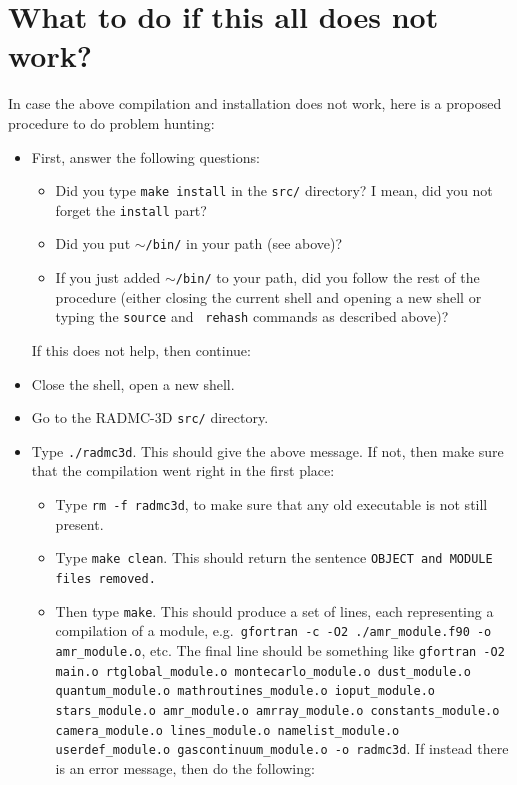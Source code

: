 \documentclass{report}
\begin{document}
\section{What to do if this all does not work?}
In case the above compilation and installation does not work, here is a 
proposed procedure to do problem hunting:
\begin{itemize}
\item First, answer the following questions:
  \begin{itemize}
    \item Did you type {\small\tt make install} in the {\small\tt src/}
      directory? I mean, did you not forget the {\small\tt install} part?
    \item Did you put $\sim${\small\tt /bin/} in your path (see above)?
    \item If you just added $\sim${\small\tt /bin/} to your path, did you
      follow the rest of the procedure (either closing the current shell and
      opening a new shell or typing the {\small\tt source} and {\small\tt
        rehash} commands as described above)?
  \end{itemize}
  If this does not help, then continue:
\item Close the shell, open a new shell.
\item Go to the RADMC-3D {\small\tt src/} directory.
\item Type {\small\tt ./radmc3d}. This should give the above message. If
  not, then make sure that the compilation went right in the first place:
  \begin{itemize}
  \item Type {\small\tt rm -f radmc3d}, to make sure that any old executable
    is not still present.
  \item Type {\small\tt make clean}. This should return the sentence
    {\small\tt OBJECT and MODULE files removed.}
  \item Then type {\small\tt make}. This should produce a set of lines, each
    representing a compilation of a module, e.g.\ {\small \tt gfortran -c -O2
      ./amr\_module.f90 -o amr\_module.o}, etc. The final line should be
    something like {\small\tt gfortran -O2 main.o rtglobal\_module.o
      montecarlo\_module.o dust\_module.o quantum\_module.o mathroutines\_module.o
      ioput\_module.o stars\_module.o amr\_module.o amrray\_module.o
      constants\_module.o camera\_module.o lines\_module.o namelist\_module.o
      userdef\_module.o gascontinuum\_module.o -o radmc3d}. If instead there
    is an error message, then do the following:

\end{itemize}
\end{itemize}
\end{document}
